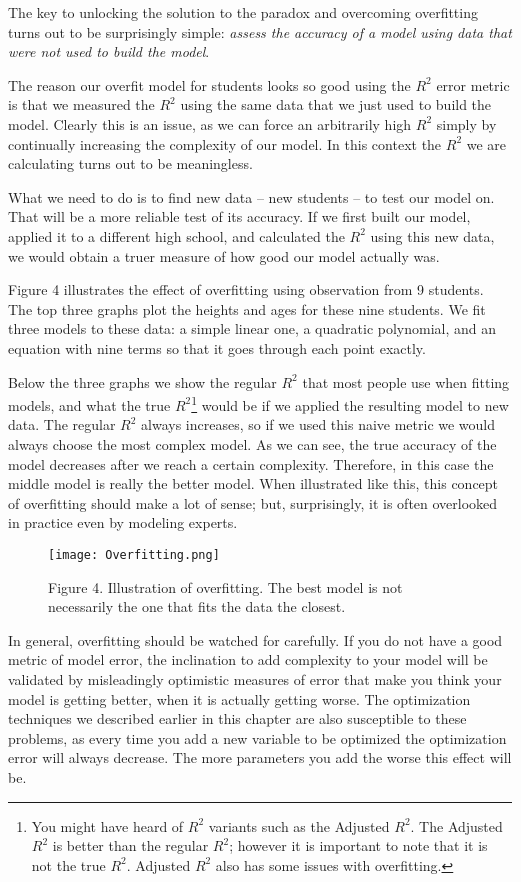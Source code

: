 \documentclass[]{memoir}
\let\Oldincludegraphics\includegraphics
\renewcommand{\includegraphics}[1]{\Oldincludegraphics[max size={\textwidth}{\textheight}]{#1}}
\begin{document}
The key to unlocking the solution to the paradox and overcoming
overfitting turns out to be surprisingly simple: \emph{assess the
accuracy of a model using data that were not used to build the model}.

The reason our overfit model for students looks so good using the $R^2$
error metric is that we measured the $R^2$ using the same data that we
just used to build the model. Clearly this is an issue, as we can force
an arbitrarily high $R^2$ simply by continually increasing the
complexity of our model. In this context the $R^2$ we are calculating
turns out to be meaningless.

What we need to do is to find new data -- new students -- to test our
model on. That will be a more reliable test of its accuracy. If we first
built our model, applied it to a different high school, and calculated
the $R^2$ using this new data, we would obtain a truer measure of how
good our model actually was.

Figure 4 illustrates the effect of overfitting using observation from 9
students. The top three graphs plot the heights and ages for these nine
students. We fit three models to these data: a simple linear one, a
quadratic polynomial, and an equation with nine terms so that it goes
through each point exactly.

Below the three graphs we show the regular $R^2$ that most people use
when fitting models, and what the true $R^2$\footnote{You might have
  heard of $R^2$ variants such as the Adjusted $R^2$. The Adjusted $R^2$
  is better than the regular $R^2$; however it is important to note that
  it is not the true $R^2$. Adjusted $R^2$ also has some issues with
  overfitting.} would be if we applied the resulting model to new data.
The regular $R^2$ always increases, so if we used this naive metric we
would always choose the most complex model. As we can see, the true
accuracy of the model decreases after we reach a certain complexity.
Therefore, in this case the middle model is really the better model.
When illustrated like this, this concept of overfitting should make a
lot of sense; but, surprisingly, it is often overlooked in practice even
by modeling experts.

\begin{figure}[htbp]
\centering
\texttt{[image: Overfitting.png]}
\caption{Figure 4. Illustration of overfitting. The best model is not
necessarily the one that fits the data the closest.}
\end{figure}

In general, overfitting should be watched for carefully. If you do not
have a good metric of model error, the inclination to add complexity to
your model will be validated by misleadingly optimistic measures of
error that make you think your model is getting better, when it is
actually getting worse. The optimization techniques we described earlier
in this chapter are also susceptible to these problems, as every time
you add a new variable to be optimized the optimization error will
always decrease. The more parameters you add the worse this effect will
be.
\end{document}
